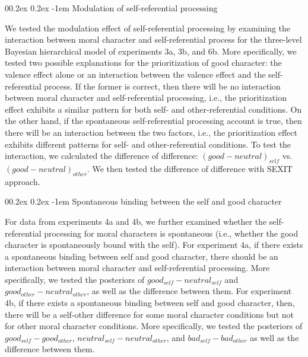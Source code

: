 \documentclass[
  man]{apa6}
\makeatletter
\let\oldparagraph\paragraph
\renewcommand{\paragraph}[1]{\oldparagraph{#1}\mbox{}}
\renewcommand{\paragraph}{\@startsection{paragraph}{4}{\parindent}%
  {0\baselineskip \@plus 0.2ex \@minus 0.2ex}%
  {-1em}%
  {\normalfont\normalsize\bfseries\itshape\typesectitle}}
\makeatother
\begin{document}
\hypertarget{modulation-of-self-referential-processing}{%
\paragraph{Modulation of self-referential processing}\label{modulation-of-self-referential-processing}}

We tested the modulation effect of self-referential processing by examining the interaction between moral character and self-referential process for the three-level Bayesian hierarchical model of experiments 3a, 3b, and 6b. More specifically, we tested two possible explanations for the prioritization of good character: the valence effect alone or an interaction between the valence effect and the self-referential process. If the former is correct, then there will be no interaction between moral character and self-referential processing, i.e., the prioritization effect exhibits a similar pattern for both self- and other-referential conditions. On the other hand, if the spontaneous self-referential processing account is true, then there will be an interaction between the two factors, i.e., the prioritization effect exhibits different patterns for self- and other-referential conditions. To test the interaction, we calculated the difference of difference: \((good - neutral)_{self}\) vs.~\((good - neutral)_{other}\). We then tested the difference of difference with SEXIT approach.

\hypertarget{spontaneous-binding-between-the-self-and-good-character}{%
\paragraph{Spontaneous binding between the self and good character}\label{spontaneous-binding-between-the-self-and-good-character}}

For data from experiments 4a and 4b, we further examined whether the self-referential processing for moral characters is spontaneous (i.e., whether the good character is spontaneously bound with the self). For experiment 4a, if there exists a spontaneous binding between self and good character, there should be an interaction between moral character and self-referential processing. More specifically, we tested the posteriors of \(good_{self} - neutral_{self}\) and \(good_{other} - neutral_{other}\), as well as the difference between them. For experiment 4b, if there exists a spontaneous binding between self and good character, then, there will be a self-other difference for some moral character conditions but not for other moral character conditions. More specifically, we tested the posteriors of \(good_{self} - good_{other}\), \(neutral_{self} - neutral_{other}\), and \(bad_{self} - bad_{other}\) as well as the difference between them.
\end{document}
